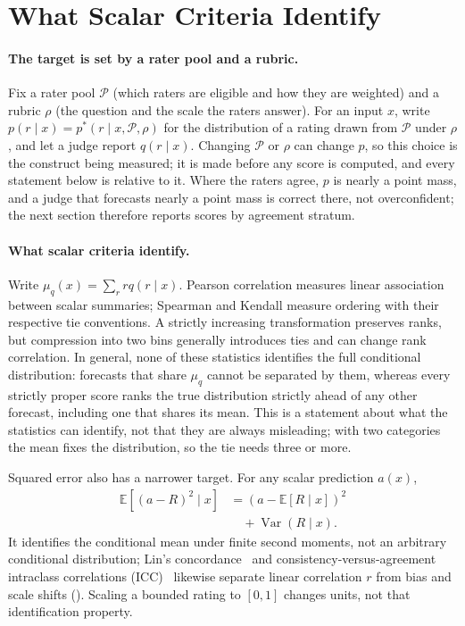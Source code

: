 \section{What Scalar Criteria Identify}
\label{sec:problem}
\paragraph{The target is set by a rater pool and a rubric.}
Fix a rater pool $\mathcal{P}$ (which raters are eligible and how they are weighted) and a rubric $\rho$ (the question and the scale the raters answer).
For an input $x$, write $p(r\mid x)=p^*(r\mid x,\mathcal{P},\rho)$ for the distribution of a rating drawn from $\mathcal{P}$ under $\rho$, and let a judge report $q(r\mid x)$.
Changing $\mathcal{P}$ or $\rho$ can change $p$, so this choice is the construct being measured; it is made before any score is computed, and every statement below is relative to it.
Where the raters agree, $p$ is nearly a point mass, and a judge that forecasts nearly a point mass is correct there, not overconfident; the next section therefore reports scores by agreement stratum.

\paragraph{What scalar criteria identify.}
Write $\mu_q(x)=\sum_r r q(r\mid x)$.
Pearson correlation measures linear association between scalar summaries; Spearman and Kendall measure ordering with their respective tie conventions.
A strictly increasing transformation preserves ranks, but compression into two bins generally introduces ties and can change rank correlation.
In general, none of these statistics identifies the full conditional distribution: forecasts that share $\mu_q$ cannot be separated by them, whereas every strictly proper score ranks the true distribution strictly ahead of any other forecast, including one that shares its mean.
This is a statement about what the statistics can identify, not that they are always misleading; with two categories the mean fixes the distribution, so the tie needs three or more.

Squared error also has a narrower target.
For any scalar prediction $a(x)$,
\begin{align}
\mathbb{E}[(a-R)^2\mid x]
&=(a-\mathbb{E}[R\mid x])^2 \\
&\quad+\operatorname{Var}(R\mid x).
\end{align}
It identifies the conditional mean under finite second moments, not an arbitrary conditional distribution; Lin's concordance~\citep{lin1989concordance} and consistency-versus-agreement intraclass correlations (ICC)~\citep{mcgraw1996forming} likewise separate linear correlation $r$ from bias and scale shifts ().
Scaling a bounded rating to $[0,1]$ changes units, not that identification property.

